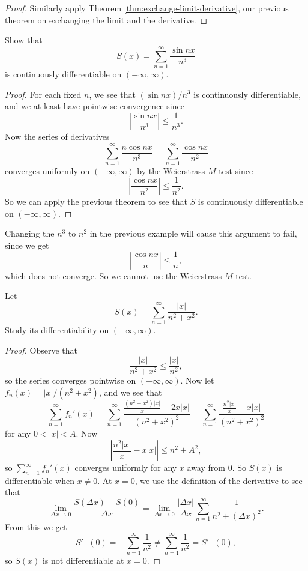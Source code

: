 \begin{proof}
  Similarly apply Theorem \ref{thm:exchange-limit-derivative},
  our previous theorem on
  exchanging the limit and the derivative.
\end{proof}

\begin{example}
  Show that
  \[
    S(x) = \sum_{n = 1}^\infty \frac{\sin nx}{n^3}
  \]
  is continuously differentiable on $(-\infty, \infty)$.
\end{example}

\begin{proof}
  For each fixed $n$, we see that
  $(\sin nx) / n^3$ is continuously
  differentiable, and we at least have pointwise
  convergence since
  \[
    \left| \frac{\sin nx}{n^3} \right| \le \frac{1}{n^3}.
  \]
  Now the series of derivatives
  \[
    \sum_{n = 1}^\infty \frac{n\cos nx}{n^3}
    = \sum_{n = 1}^\infty \frac{\cos nx}{n^2}
  \]
  converges uniformly on $(-\infty, \infty)$ by the
  Weierstrass $M$-test since
  \[
    \left| \frac{\cos nx}{n^2} \right| \le \frac{1}{n^2}.
  \]
  So we can apply the previous theorem to see that
  $S$ is continuously differentiable on
  $(-\infty, \infty)$.
\end{proof}

\begin{remark}
  Changing the $n^3$ to $n^2$ in the previous example
  will cause this argument to fail, since we get
  \[
    \left| \frac{\cos nx}{n} \right| \le \frac{1}{n},
  \]
  which does not converge. So we cannot use the
  Weierstrass $M$-test.
\end{remark}

\begin{example}
  Let
  \[
    S(x) = \sum_{n = 1}^\infty \frac{|x|}{n^2 + x^2}.
  \]
  Study its differentiability on $(-\infty, \infty)$.
\end{example}

\begin{proof}
  Observe that
  \[
    \frac{|x|}{n^2 + x^2} \le \frac{|x|}{n^2},
  \]
  so the series converges pointwise on
  $(-\infty, \infty)$. Now let $f_n(x) = |x| / (n^2 + x^2)$,
  and we see that
  \[
    \sum_{n = 1}^\infty f_n'(x)
    = \sum_{n = 1}^\infty \frac{\frac{(n^2 + x^2)|x|}{x} - 2x |x|}{(n^2 + x^2)^2}
    = \sum_{n = 1}^\infty \frac{\frac{n^2|x|}{x} - x |x|}{(n^2 + x^2)^2}
  \]
  for any $0 < |x| < A$.
  Now
  \[
    \left| \frac{n^2 |x|}{x} - x |x| \right|
    \le n^2 + A^2,
  \]
  so $\sum_{n = 1}^\infty f_n'(x)$ converges uniformly
  for any $x$ away from $0$. So $S(x)$ is differentiable
  when $x \ne 0$.
  At $x = 0$, we use the definition of the derivative
  to see that
  \[
    \lim_{\Delta x \to 0} \frac{S(\Delta x) - S(0)}{\Delta x}
    = \lim_{\Delta x \to 0} \frac{|\Delta x|}{\Delta x} \sum_{n = 1}^\infty \frac{1}{n^2 + (\Delta x)^2}.
  \]
  From this we get
  \[
    S'_-(0) = -\sum_{n = 1}^\infty \frac{1}{n^2}
    \ne \sum_{n = 1}^\infty \frac{1}{n^2}
    = S'_+(0),
  \]
  so $S(x)$ is not differentiable at $x = 0$.
\end{proof}
